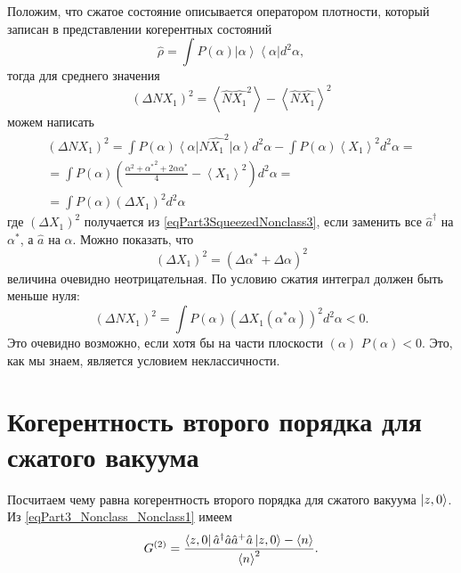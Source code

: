 Положим, что сжатое состояние описывается оператором плотности,
который записан в представлении когерентных состояний
\[
\hat{\rho} = \int P\left(\alpha\right)
\left|\alpha\right>
\left<\alpha\right| d^2 \alpha,
\]
тогда для среднего значения 
\begin{equation}
\left(\Delta N X_1\right)^2 = 
\left<\hat{N} \hat{X_1}^2\right> - \left<\hat{N} \hat{X_1}\right>^2 
\label{eqPart3SqueezedNonclass3}
\end{equation}
можем написать
\begin{eqnarray}
  \left(\Delta N X_1\right)^2 =
  \int P\left(\alpha\right)
  \left<\alpha\right|
  \hat{N} \hat{X_1}^2
  \left|\alpha\right> d^2 \alpha -
  \int P\left(\alpha\right)
  \left< X_1 \right>^2
  d^2 \alpha
  =
  \nonumber \\
  =
  \int  
  P\left(\alpha\right)
  \left(
  \frac{
    \alpha^2 + {\alpha^\ast}^2 +
    2 \alpha \alpha^\ast}{4}
  - \left< X_1 \right>^2
  \right)
   d^2 \alpha
  =
  \nonumber \\
  =
 \int 
P\left(\alpha\right)
\left(\Delta X_1\right)^2
d^2 \alpha
\end{eqnarray}
где $\left(\Delta X_1\right)^2$ получается из
\eqref{eqPart3SqueezedNonclass3}, если заменить все $\hat{a}^{\dag}$ на
$\alpha^{*}$, а $\hat{a}$ на $\alpha$. Можно показать, что
\[
\left(\Delta X_1\right)^2 = \left(\Delta \alpha^{*} + \Delta \alpha\right)^2
\]
величина очевидно неотрицательная. По условию сжатия интеграл должен
быть меньше нуля:
\begin{equation}
\left(\Delta N X_1\right)^2 = 
 \int 
P\left(\alpha\right)
\left(\Delta X_1\left(\alpha^{*}\alpha\right)\right)^2
d^2 \alpha < 0.
\nonumber
\end{equation}
Это очевидно возможно, если хотя бы на части плоскости
$\left(\alpha\right)$ $P\left(\alpha\right) < 0$. Это, как мы знаем,
является условием неклассичности. 

\section{Когерентность второго порядка для сжатого вакуума}

Посчитаем чему равна когерентность второго порядка для сжатого вакуума
$\ket{z, 0}$. Из \eqref{eqPart3_Nonclass_Nonclass1} имеем
\[
G^{(2)} = \frac{\bra{z,0}\hat{a}^{\dag}\hat{a}\hat{a}^{+}\hat{a}\ket{z,0}
- \left<n\right>}{\left<n\right>^2}.
\]

